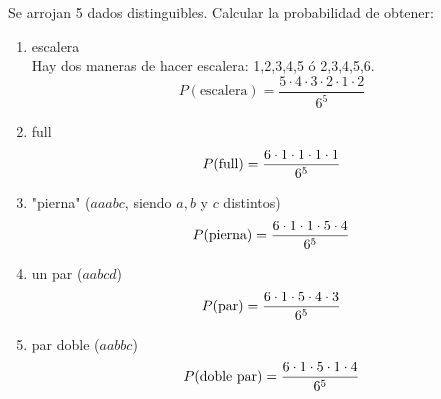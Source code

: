 \item Se arrojan 5 dados distinguibles. Calcular la probabilidad de obtener:
    \begin{enumerate}
        \item escalera\e\\
            Hay dos maneras de hacer escalera: 1,2,3,4,5 ó 2,3,4,5,6.\[P(\text{escalera})=\frac{5\cdot4\cdot3\cdot2\cdot1\cdot2}{6^5}\]
        \item full
            \[P(\text{full})=\frac{6\cdot1\cdot1\cdot1\cdot1}{6^5}\]
        \item "pierna" ($aaabc$, siendo $a,b$ y $c$ distintos)
            \[P(\text{pierna})=\frac{6\cdot1\cdot1\cdot5\cdot4}{6^5}\]
        \item un par ($aabcd$)
            \[P(\text{par})=\frac{6\cdot1\cdot5\cdot4\cdot3}{6^5}\]
        \item par doble ($aabbc$)
            \[P(\text{doble par})=\frac{6\cdot1\cdot5\cdot1\cdot4}{6^5}\]
    \end{enumerate}